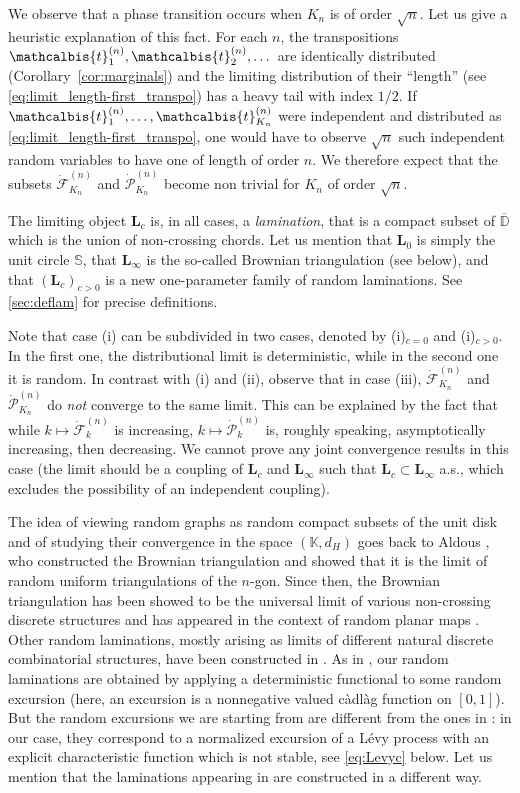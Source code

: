 \documentclass[10pt]{amsart}
\theoremstyle{definition}\newtheorem{defi}[theo]{Definition}\newtheorem{rema}[theo]{Remark}\newtheorem{exam}[theo]{Example}\newtheorem{exem}[theo]{Example}\newtheorem{nota}[theo]{Notation}
\newcommand{\D}{\mathbb{D}}
\def\PPP{\mathcal P}
\def\FFF{\mathcal F}
\def\dFKn{\dot{\mathcal{F}}^{(n)}_{K_{n}}}
\def\dPKn{\dot{\mathcal{P}}^{(n)}_{K_{n}}}
\def\tb{\mathcalbis{t}}
\begin{document}
We observe that a phase transition occurs when $K_n$ is of order $\sqrt{n}$.
Let us give a heuristic explanation of this fact.
For each $n$, the transpositions $\tb_{1}^{(n)}, \tb_{2}^{(n)}, \dots$ are identically distributed (Corollary~\ref{cor:marginals})
and the limiting distribution of their ``length'' (see \eqref{eq:limit_length-first_transpo}) has a heavy tail with index $1/2$.
If $\tb_{1}^{(n)}, \ldots, \tb_{ K_{n}}^{(n)}$ were independent and distributed as \eqref{eq:limit_length-first_transpo},
one would have to observe $\sqrt{n}$ such independent random variables to have one of length of order $n$.
We therefore expect that the subsets $\dFKn$ and $\dPKn$ become non trivial for $K_n$ of order $\sqrt{n}$.
\medskip

The limiting object $\mathbf{L}_{c}$  is, in all cases, a \emph{lamination},
that is a compact subset of $\overline{\D}$ which is  the union of non-crossing chords. Let us mention that $\mathbf{L}_{0}$ is simply the unit circle $\mathbb{S}$, that $\mathbf{L}_{\infty}$ is the so-called Brownian triangulation (see below), and that $(\mathbf{L}_{c})_{c  > 0}$ is a new one-parameter family of random laminations. See \cref{sec:deflam} for  precise definitions.

Note that case (i) can be subdivided in two cases, denoted by (i)$_{c=0}$ and  (i)$_{c>0}$. In the first one, the distributional limit is deterministic, while in the second one it is random.
In contrast with (i) and (ii),  observe that in case (iii),
$\dFKn$ and $\dPKn$ do \emph{not} converge to the same limit.
This can be  explained by the fact that while $k \mapsto \dot{\FFF}^{(n)}_{k}$ is increasing,
$k \mapsto \dot{\PPP}^{(n)}_{k}$ is, roughly speaking, asymptotically increasing, then decreasing.
We cannot prove any joint convergence results in this case
(the limit should be a coupling of $\mathbf{L}_{c}$ and $\mathbf{L}_{\infty}$
such that $\mathbf{L}_{c} \subset \mathbf{L}_{\infty}$ a.s.,
which excludes the possibility of an independent coupling).

The idea of viewing random graphs as random compact subsets of the unit disk and of studying their convergence in the space $(\mathbb{K},d_{H})$ goes back to Aldous \cite{Ald94a,Ald94b}, who constructed the Brownian triangulation and showed that it is the limit of random uniform triangulations of the $n$-gon.
Since then, the Brownian triangulation has been showed to be the universal limit of various non-crossing discrete structures \cite{Kor14,CK14,KM17,Bet17} and has appeared in the context of random planar maps \cite{LGP08}.
Other random laminations, mostly arising as limits of different natural discrete combinatorial structures, have been constructed in \cite{CLGrecursive,CWmht,Kor14,KM16}.
As in \cite{Kor14}, our random laminations are obtained by applying a deterministic functional  to some random excursion
(here, an excursion is a nonnegative valued c\`adl\`ag function on $[0,1]$).
But the random excursions we are starting from are different from the ones in \cite{Kor14}:
in our case, they correspond to a normalized excursion of a L\'evy process with
an explicit characteristic function which is not stable, see \cref{eq:Levyc} below.
Let us mention that the laminations appearing in \cite{CLGrecursive,CWmht,KM16} are constructed in a different way.
\end{document}
